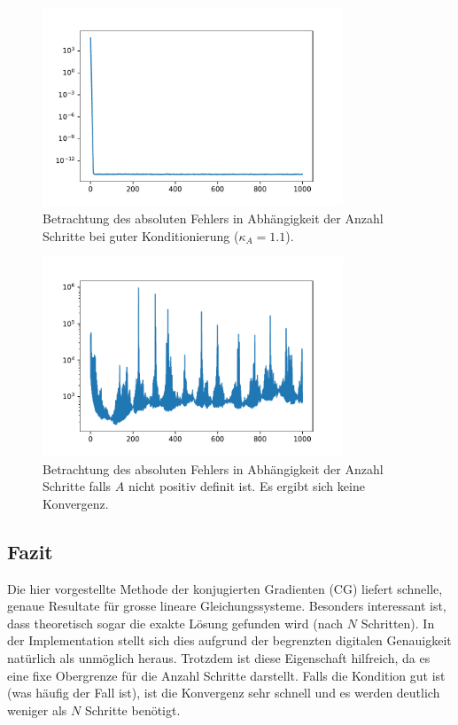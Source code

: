 \begin{figure}	
	\centering
	\includegraphics[width=0.8\textwidth]{papers/cg/images/convergence_k_1_1}
	\caption{Betrachtung des absoluten Fehlers in Abhängigkeit der Anzahl Schritte bei guter Konditionierung ($\kappa_A=1.1$).}
	\label{cg:abb:fast_conv}
\end{figure}

\begin{figure}	
	\centering
	\includegraphics[width=0.8\textwidth]{papers/cg/images/no_convergence}
	\caption{Betrachtung des absoluten Fehlers in Abhängigkeit der Anzahl Schritte falls $A$ nicht positiv definit ist. 
			Es ergibt sich keine Konvergenz.}
	\label{cg:abb:no_conv}
\end{figure}

\subsection{Fazit}
Die hier vorgestellte Methode der konjugierten Gradienten (CG) liefert schnelle, genaue Resultate für grosse lineare Gleichungssysteme.
Besonders interessant ist, dass theoretisch sogar die exakte Lösung gefunden wird (nach $N$ Schritten).
In der Implementation stellt sich dies aufgrund der begrenzten digitalen Genauigkeit natürlich als unmöglich heraus.
Trotzdem ist diese Eigenschaft hilfreich, da es eine fixe Obergrenze für die Anzahl Schritte darstellt.
Falls die Kondition gut ist (was häufig der Fall ist), ist die Konvergenz sehr schnell und es werden deutlich weniger als $N$ Schritte benötigt.